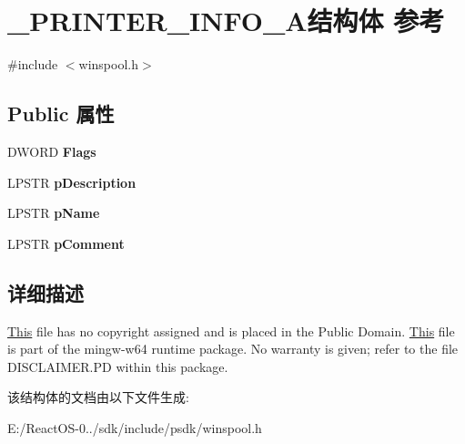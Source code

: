 \hypertarget{struct___p_r_i_n_t_e_r___i_n_f_o__1_a}{}\section{\+\_\+\+P\+R\+I\+N\+T\+E\+R\+\_\+\+I\+N\+F\+O\+\_\+A结构体 参考}
\label{struct___p_r_i_n_t_e_r___i_n_f_o__1_a}


{\ttfamily \#include $<$winspool.\+h$>$}

\subsection*{Public 属性}
\begin{DoxyCompactItemize}
\item 
\mbox{\label{struct___p_r_i_n_t_e_r___i_n_f_o__1_a_a628923eb63e693d80a308377f59b3552}} 
D\+W\+O\+RD {\bfseries Flags}
\item 
\mbox{\label{struct___p_r_i_n_t_e_r___i_n_f_o__1_a_a654c248a75b662e24ef8e7b40d3193f8}} 
L\+P\+S\+TR {\bfseries p\+Description}
\item 
\mbox{\label{struct___p_r_i_n_t_e_r___i_n_f_o__1_a_a68c52ecb5225e63e5b8938275e8db0a0}} 
L\+P\+S\+TR {\bfseries p\+Name}
\item 
\mbox{\label{struct___p_r_i_n_t_e_r___i_n_f_o__1_a_a32e7a5eb44cdf2c1a36ab0aceee3a469}} 
L\+P\+S\+TR {\bfseries p\+Comment}
\end{DoxyCompactItemize}


\subsection{详细描述}
\hyperlink{namespace_this}{This} file has no copyright assigned and is placed in the Public Domain. \hyperlink{namespace_this}{This} file is part of the mingw-\/w64 runtime package. No warranty is given; refer to the file D\+I\+S\+C\+L\+A\+I\+M\+E\+R.\+PD within this package. 

该结构体的文档由以下文件生成\+:\begin{DoxyCompactItemize}
\item 
E\+:/\+React\+O\+S-\/0../sdk/include/psdk/winspool.\+h\end{DoxyCompactItemize}
